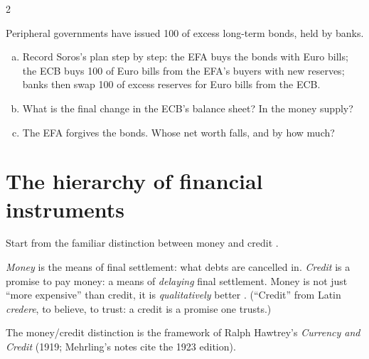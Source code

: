\begin{paracol}{2}
\begin{exercise}
Peripheral governments have issued 100 of excess long-term bonds, held by banks.
\begin{enumerate}[(a)]
  \item Record Soros's plan step by step: the EFA buys the bonds with Euro bills; the ECB buys 100 of Euro bills from the
        EFA's buyers with new reserves; banks then swap 100 of excess reserves for Euro bills from the ECB.
  \item What is the final change in the ECB's balance sheet? In the money supply?
  \item The EFA forgives the bonds. Whose net worth falls, and by how much?
\end{enumerate}
\end{exercise}

\section{The hierarchy of financial instruments}\label{sec:nh-instruments}

Start from the familiar distinction between money and credit .

\begin{definition}\label{def:nh-money}
\emph{Money} is the means of final settlement: what debts are cancelled in. \emph{Credit} is a promise to pay money:
a means of \emph{delaying} final settlement. Money is not just ``more expensive'' than credit, it is
\emph{qualitatively} better . (``Credit'' from Latin \emph{credere}, to believe, to trust: a credit is a
promise one trusts.)
\end{definition}\begin{coursenote}[Hawtrey]
The money/credit distinction is the framework of Ralph Hawtrey's \emph{Currency and Credit} (1919; Mehrling's notes 
cite the 1923 edition).
\end{coursenote}


\end{paracol}
